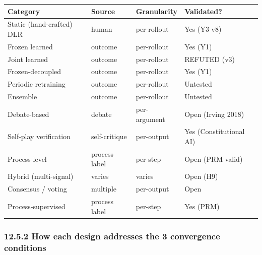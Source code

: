 \documentclass[11pt]{article}
\begin{document}
{\def\LTcaptype{none} %
\begin{longtable}[]{@{}
  >{\raggedright\arraybackslash}p{}
  >{\raggedright\arraybackslash}p{}
  >{\raggedright\arraybackslash}p{}
  >{\raggedright\arraybackslash}p{}@{}}
\toprule\noalign{}
\begin{minipage}[b]{\linewidth}\raggedright
Category
\end{minipage} & \begin{minipage}[b]{\linewidth}\raggedright
Source
\end{minipage} & \begin{minipage}[b]{\linewidth}\raggedright
Granularity
\end{minipage} & \begin{minipage}[b]{\linewidth}\raggedright
Validated?
\end{minipage} \\
\midrule\noalign{}
\endhead
\bottomrule\noalign{}
\endlastfoot
Static (hand-crafted) DLR & human & per-rollout & Yes (Y3 v8) \\
Frozen learned & outcome & per-rollout & Yes (Y1) \\
Joint learned & outcome & per-rollout & REFUTED (v3) \\
Frozen-decoupled & outcome & per-rollout & Yes (Y1) \\
Periodic retraining & outcome & per-rollout & Untested \\
Ensemble & outcome & per-rollout & Untested \\
Debate-based & debate & per-argument & Open (Irving 2018) \\
Self-play verification & self-critique & per-output & Yes
(Constitutional AI) \\
Process-level & process label & per-step & Open (PRM valid) \\
Hybrid (multi-signal) & varies & varies & Open (H9) \\
Consensus / voting & multiple & per-output & Open \\
Process-supervised & process label & per-step & Yes (PRM) \\
\end{longtable}
}

\subsubsection{12.5.2 How each design addresses the 3 convergence
conditions}\label{how-each-design-addresses-the-3-convergence-conditions}
\end{document}
